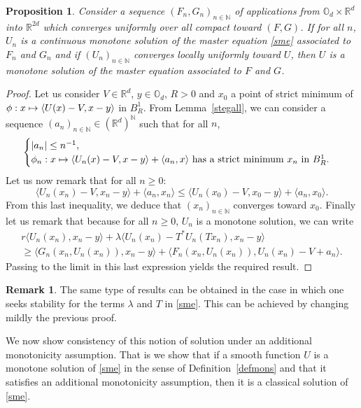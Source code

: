 \documentclass[10pt]{amsart}
\newcommand\mto{\mathchoice{\longmapsto}{\mapsto}{\mapsto}{\mapsto}}
\newtheorem{Prop}{Proposition}[section]
\theoremstyle{definition}
\newtheorem{Rem}{Remark}[section]
\begin{document}
\begin{Prop}\label{stabs}
Consider a sequence $(F_n,G_n)_{n \in \mathbb{N}}$ of applications from $\mathbb{O}_d\times \mathbb{R}^d$ into $\mathbb{R}^{2d}$ which converges uniformly over all compact toward $(F,G)$. If for all $n$, $U_n$ is a continuous monotone solution of the master equation \eqref{sme} associated to $F_n$ and $G_n$ and if $(U_n)_{n \in \mathbb{N}}$ converges locally uniformly toward $U$, then $U$ is a monotone solution of the master equation associated to $F$ and $G$.
\end{Prop}
\begin{proof}
Let us consider $V \in \mathbb{R}^d$, $y \in \mathbb{O}_d$, $R>0$ and $x_0$ a point of strict minimum of $\phi: x \mto \langle U(x)-V, x-y\rangle$ in $B^1_R$. From Lemma~\ref{stegall}, we can consider a sequence $(a_n)_{n \in \mathbb{N}} \in (\mathbb{R}^d)^{\mathbb{N}}$ such that for all $n$,
\begin{equation*}
\begin{cases}
|a_n| \leq n^{-1},\\
\phi_n: x \mto \langle U_n(x)-V, x-y\rangle+\langle a_n,x\rangle \text{ has a strict minimum $x_n$ in }B^1_R.
\end{cases}
\end{equation*}
Let us now remark that for all $n \geq 0$:
\begin{equation*}
\langle U_n(x_n)- V, x_n-y\rangle+\langle a_n, x_n\rangle \leq \langle U_n(x_0)-V, x_0-y\rangle+\langle a_n,x_0\rangle.
\end{equation*}
From this last inequality, we deduce that $(x_n)_{n \in \mathbb{N}}$ converges toward $x_0$. Finally let us remark that because for all $n \geq 0$, $U_n$ is a monotone solution, we can write
\begin{multline*}
r\langle U_n(x_n), x_n-y\rangle + \lambda \langle U_n(x_n)-T^*U_n(Tx_n),x_n-y \rangle \\
\geq
 \langle G_n(x_n, U_n(x_n)), x_n-y\rangle+\langle F_n(x_n,U_n(x_n)), U_n(x_n)-V+a_n\rangle.
\end{multline*}
Passing to the limit in this last expression yields the required result.
\end{proof}
\begin{Rem}
The same type of results can be obtained in the case in which one seeks stability for the terms $\lambda$ and $T$ in \eqref{sme}. This can be achieved by changing mildly the previous proof.
\end{Rem}
We now show consistency of this notion of solution under an additional monotonicity assumption. That is we show that if a smooth function $U$ is a monotone solution of \eqref{sme} in the sense of Definition~\ref{defmons} and that it satisfies an additional monotonicity assumption, then it is a classical solution of \eqref{sme}.
\end{document}
